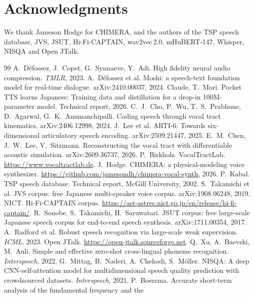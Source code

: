 \documentclass[10pt,a4paper,twocolumn]{article}
\begin{document}
\section*{Acknowledgments}
We thank Jameson Hodge for CHIMERA, and the authors of the TSP speech database, JVS, JSUT,
Hi-Fi-CAPTAIN, wav2vec\,2.0, mHuBERT-147, Whisper, NISQA and Open JTalk.

\begin{thebibliography}{99}\footnotesize
\setlength{\itemsep}{0pt}\setlength{\parskip}{1.5pt plus 1pt}
 A.~Défossez, J.~Copet, G.~Synnaeve, Y.~Adi. High fidelity neural audio
compression. \emph{TMLR}, 2023.
 A.~Défossez et al. Moshi: a speech-text foundation model for real-time dialogue.
arXiv:2410.00037, 2024.
 Claude, T.~Mori. Pocket TTS learns Japanese: Training data and distillation for
a drop-in 100M-parameter model. Technical report, 2026.
 C.~J.~Cho, P.~Wu, T.~S.~Prabhune, D.~Agarwal, G.~K.~Anumanchipalli. Coding speech
through vocal tract kinematics. arXiv:2406.12998, 2024.
 J.~Lee et al. ARTI-6: Towards six-dimensional articulatory speech encoding.
arXiv:2509.21447, 2025.
 E.~M.~Chen, J.~W.~Lee, V.~Sitzmann. Reconstructing the vocal tract with
differentiable acoustic simulation. arXiv:2609.36737, 2026.
 P.~Birkholz. VocalTractLab. \url{https://www.vocaltractlab.de}.
 J.~Hodge. CHIMERA: a physical-modeling voice synthesizer.
\url{https://github.com/jamesondh/chimera-vocal-synth}, 2026.
 P.~Kabal. TSP speech database. Technical report, McGill University, 2002.
 S.~Takamichi et al. JVS corpus: free Japanese multi-speaker voice corpus.
arXiv:1908.06248, 2019.
 NICT. Hi-Fi-CAPTAIN corpus.
\url{https://ast-astrec.nict.go.jp/en/release/hi-fi-captain/}.
 R.~Sonobe, S.~Takamichi, H.~Saruwatari. JSUT corpus: free large-scale Japanese
speech corpus for end-to-end speech synthesis. arXiv:1711.00354, 2017.
 A.~Radford et al. Robust speech recognition via large-scale weak supervision.
\emph{ICML}, 2023.
 Open JTalk. \url{https://open-jtalk.sourceforge.net}.
 Q.~Xu, A.~Baevski, M.~Auli. Simple and effective zero-shot cross-lingual
phoneme recognition. \emph{Interspeech}, 2022.
 G.~Mittag, B.~Naderi, A.~Chehadi, S.~Möller. NISQA: A deep CNN-self-attention
model for multidimensional speech quality prediction with crowdsourced datasets.
\emph{Interspeech}, 2021.
 P.~Boersma. Accurate short-term analysis of the fundamental frequency and the

\end{thebibliography}
\end{document}

